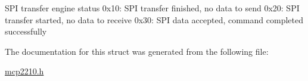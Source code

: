 \-S\-P\-I transfer engine status 0x10\-: \-S\-P\-I transfer finished, no data to send 0x20\-: \-S\-P\-I transfer started, no data to receive 0x30\-: \-S\-P\-I data accepted, command completed successfully 

\-The documentation for this struct was generated from the following file\-:\begin{DoxyCompactItemize}
\item 
\hyperlink{mcp2210_8h}{mcp2210.\-h}\end{DoxyCompactItemize}
